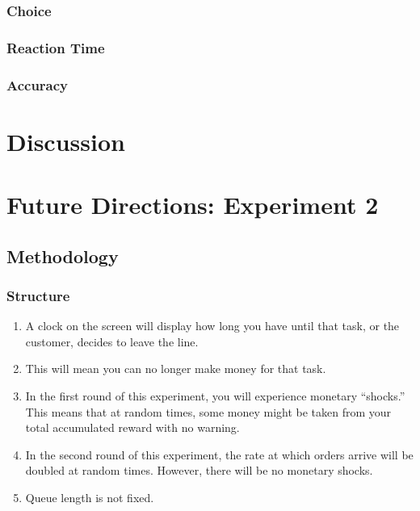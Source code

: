 \documentclass[
]{report}
\begin{document}
\hypertarget{choice}{%
\subsection{Choice}\label{choice}}

\hypertarget{reaction-time-1}{%
\subsection{Reaction Time}\label{reaction-time-1}}

\hypertarget{accuracy-1}{%
\subsection{Accuracy}\label{accuracy-1}}

\hypertarget{discussion}{%
\chapter{Discussion}\label{discussion}}

\hypertarget{future-directions-experiment-2}{%
\chapter{Future Directions: Experiment
2}\label{future-directions-experiment-2}}

\hypertarget{methodology-2}{%
\section{Methodology}\label{methodology-2}}

\hypertarget{structure-2}{%
\subsection{Structure}\label{structure-2}}

\begin{enumerate}
\def\labelenumi{\arabic{enumi}.}
\item
  A clock on the screen will display how long you have until that task,
  or the customer, decides to leave the line.
\item
  This will mean you can no longer make money for that task.
\item
  In the first round of this experiment, you will experience monetary
  ``shocks.'' This means that at random times, some money might be taken
  from your total accumulated reward with no warning.
\item
  In the second round of this experiment, the rate at which orders
  arrive will be doubled at random times. However, there will be no
  monetary shocks.
\item
  Queue length is not fixed.
\end{enumerate}
\end{document}

